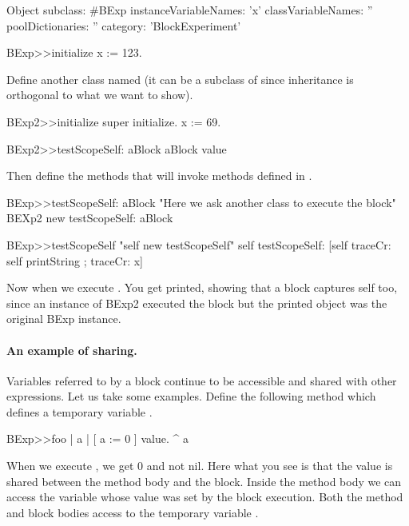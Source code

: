 \documentclass[a4paper,10pt,twoside]{book}
\begin{document}
\begin{code}{}
Object subclass: #BExp
	instanceVariableNames: 'x'
	classVariableNames: ''
	poolDictionaries: ''
	category: 'BlockExperiment'
\end{code}

\begin{code}{}
BExp>>initialize
	x := 123.
\end{code}	

Define another class named  (it can be a subclass of  since inheritance is orthogonal to what we want to show).


\begin{code}{}
BExp2>>initialize
	super initialize.
	x := 69.

BExp2>>testScopeSelf: aBlock
	aBlock value
\end{code}

Then define the methods that will invoke  methods defined in .
\begin{code}{}	
BExp>>testScopeSelf: aBlock
	"Here we ask another class to execute the block"
	BEXp2 new testScopeSelf: aBlock
	
BExp>>testScopeSelf
	"self new testScopeSelf"
	self testScopeSelf: [self traceCr: self printString ; traceCr: x]
\end{code}	

Now when we execute . You get  printed, showing that a block captures self too, since an instance of BExp2 executed the block but the printed object was the original BExp instance. 

\paragraph{An example of sharing.}

Variables referred to by a block continue to be accessible and shared with other expressions. Let us  take some examples. Define the following method  which defines a temporary variable .

\begin{code}{}
BExp>>foo
	| a |
	[ a := 0 ] value.
	^ a
\end{code}

When we execute , we get 0 and not nil. 
Here what you see is that the value is shared between the method body and the block. Inside the method body we can access the variable whose value was set by the block execution. 
Both the method  and block bodies access to the temporary variable .
\end{document}
